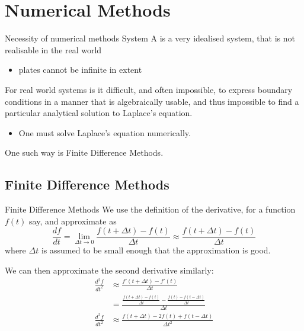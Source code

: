 \documentclass{beamer}
\newcommand{\be}{\begin{equation}}
\newcommand{\ee}{\end{equation}}
\begin{document}
\section{Numerical Methods}
\begin{frame}{Necessity of numerical methods}
System A is a very idealised system, that is not realisable in the real world
\begin{itemize}
\item plates cannot be infinite in extent
\end{itemize}

For real world systems is it difficult, and often impossible, to express boundary
conditions in a manner that is algebraically usable, and thus impossible to find a
particular analytical solution to Laplace's equation.
\begin{itemize}
\item One must solve Laplace's equation numerically.
\end{itemize}

One such way is Finite Difference Methods.
\end{frame}

\subsection{Finite Difference Methods}

\begin{frame}{Finite Difference Methods}
We use the definition of the derivative, for a function $f(t)$ say, and approximate as
%
\be
\frac{df}{dt} = \lim_{\Delta t\to 0}\frac{f(t+\Delta t) - f(t)}{\Delta t} \approx \frac{f(t+\Delta t) - f(t)}{\Delta t}
\ee
%
where $\Delta t$ is assumed to be small enough that the approximation is good.

We can then approximate the second derivative similarly:
%
\begin{align}
\frac{d^2 f}{dt^2} &\approx \frac{f'(t+\Delta t) - f'(t)}{\Delta t} \\
		   &= \frac{\frac{f(t+\Delta t) - f(t)}{\Delta t} - \frac{f(t) - f(t-\Delta t)}{\Delta t}}{\Delta t} \\
\frac{d^2 f}{dt^2} &\approx  \frac{f(t+\Delta t) - 2f(t) + f(t-\Delta t)}{\Delta t^2}
\end{align}

\end{frame}
\end{document}
